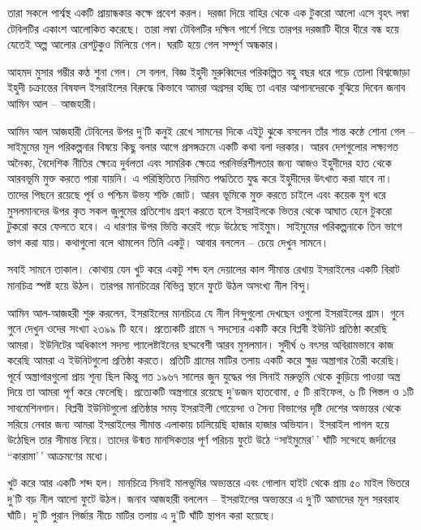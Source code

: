 \documentclass[
]{book}
\begin{document}
তারা সকলে পার্শ্বস্থ একটি প্রায়ান্ধকার কক্ষে প্রবেশ করল। দরজা দিয়ে বাহির থেকে এক টুকরো আলো এসে বৃহৎ লম্বা টেবিলটির একাংশ আলোকিত করেছে। তারা লম্বা টেবিলটির দক্ষিন পার্শে গিয়ে তারপর দরজাটি ধীরে ধীরে বন্ধ হয়ে যেতেই অল্প আলোর রেশটুকুও মিলিয়ে গেল। ঘরটি হয়ে গেল সম্পূর্ণ অন্ধকার।

আহমদ মুসার গম্ভীর কণ্ঠ শুনা গেল। সে বলল, বিজ্ঞ ইহুদী মুরুব্বিদের পরিকল্পিত বহু বছর ধরে গড়ে তোলা বিশ্বজোড়া ইহুদী চক্রান্তের বিষফল ইসরাইলের বিরুদ্ধে কিভাবে আমরা অগ্রসর হচ্ছি তা এবার আপানদেরকে বুঝিয়ে দিবেন জনাব আমিন আল -- আজহারী।

আমিন আল আজহারী টেবিলের উপর দু'টি কনুই রেখে সামনের দিকে এইটু ঝুকে বসলেন তাঁর শান্ত কন্ঠে শোনা গেল -- সাইমুমের মূল পরিকল্পনার বিষয়ে কিছু বলার আগে প্রসঙ্গক্রমে একটি কথা বলা দরকার। আরব দেশগুলোর লক্ষ্যগত অনৈক্য, বৈদেশিক নীতির ক্ষেত্রে দুর্বলতা এবং সামরিক ক্ষেত্রে পরনির্ভরশীলতার জন্য আজও ইহুদীদের হাত থেকে আরবভূমি মুক্ত করতে পারা যায়নি। এ পরিস্থিতিতে নিয়মিত পদ্ধতিতে যুদ্ধ করে ইহুদীদের উৎখাত করা যাবে না। তাদের পিছনে রয়েছে পূর্ব ও পশ্চিম উভয় শক্তি জোট। আরব ভূমিকে মুক্ত করতে চাইলে এবং কয়েক যুগ ধরে মুসলমানদের উপর কৃত সকল জুলুমের প্রতিশোধ গ্রহণ করতে হলে ইসরাইলকে ভিতর থেকে আঘাত হেনে টুকরো টুকরো করে ফেলতে হবে। এ ধারণার উপর ভিত্তি করেই গড়ে উঠেছে সাইমুম। সাইমুমের পরিকল্পনাকে তিন ভাগে ভাগ করা যায়। কথাগুলো বলে থামলেন তিনি একটু। আবার বললেন -- চেয়ে দেখুন সামনে।

সবাই সামনে তাকাল। কোথায় যেন খুট করে একটু শব্দ হল দেয়ালের কাল সীমান্ত রেখায় ইসরাইলের একটি বিরাট মানচিত্র স্পষ্ট হয়ে উঠল। তারপর মানচিত্রের বিভিন্ন স্থানে ফুটে উঠল অসংখ্য নীল বিন্দু।

আমিন আল-আজহরী শুরু করলেন, ইসরাইলের মানচিত্রে যে নীল বিন্দুগুলো দেখছেন ওগুলো ইসরাইলের গ্রাম। গুনে গুনে দেখুন ওদের সংখ্যা ২৩৯৯ টি হবে। প্রত্যেকটি গ্রামে ৭ সদস্যের একটি করে বিপ্লবী ইউনিট প্রতিষ্ঠা করেছি আমরা। ইউনিটের অধিকাংশ সদস্য প্যালেষ্টাইনের ছদ্মবেশী আরব মুসলমান। সুদীর্ঘ ৬ বৎসর অবিরামভাবে কাজ করেছি আমরা এ ইউনিটগুলো প্রতিষ্ঠা করতে। প্রতিটি গ্রামের মাটির তলায় একটি করে ক্ষুদ্র অস্ত্রাগার তৈরী করেছি। পূর্বে অস্ত্রাগারগুলো প্রায় শূন্য ছিল কিন্তু গত ১৯৬৭ সালের জুন যুদ্ধের পর সিনাই মরুভূমি থেকে কুড়িয়ে পাওয়া অস্ত্র দিয়ে তা আমরা পূর্ণ করে ফেলেছি। প্রত্যেকটি অস্ত্রগারে রয়েছে দু'ডজন হাতবোমা, ৫ টি রাইফেল, ৬ টি পিস্তল ও ১টি সাবমেশিনগান। বিপ্লবী ইউনিটগুলো প্রতিষ্ঠার সময় ইসরাইলী গোয়েন্দা ও সৈন্য বিভাগের দৃষ্টি দেশের অভ্যন্তর থেকে সরিয়ে নেবার জন্য আমরা ইসরাইলের সীমান্ত এলাকায় চালিয়েছি হাজার হাজার অভিযান। ইসরাইল পাগল হয়ে উঠেছিল তার সীমান্ত নিয়ে। তাদের উন্মত্ত মানসিকতার পূর্ণ পরিচয় ফুটে উঠে ``সাইমুমের'\,' ঘাঁটি সন্দেহে জর্দানের ``কারামা'\,' আক্রমণের মধ্যে।

খুট করে আর একটি শব্দ হল। মানচিত্রে সিনাই মালভূমির অভ্যন্তরে এবং গোলান হাইট থেকে প্রায় ৫০ মাইল ভিতরে দু'টি বড় নীল আলো ফুটে উঠল। জনাব আজহারী বললেন -- ইসরাইলের অভ্যন্তরে এ দু'টি আমাদের মূল সরবরাহ ঘাঁটি। দু'টি পুরান গির্জার নীচে মাটির তলায় এ দু'টি ঘাঁটি স্থাপন করা হয়েছে।
\end{document}
